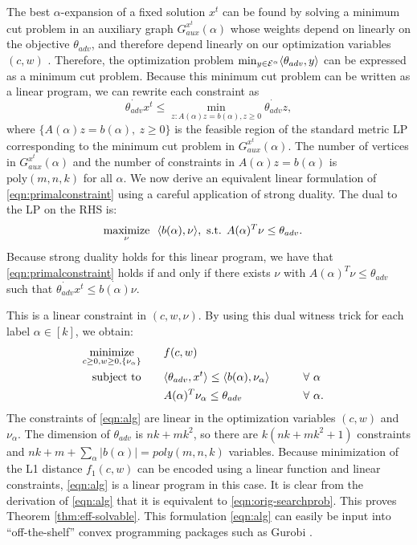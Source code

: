 The best $\alpha$-expansion of a fixed solution $x^t$ can be found by solving a minimum cut problem in an auxiliary graph $G^{x^t}_{aux}(\alpha)$ whose weights depend on linearly on the objective $\theta_{adv}$, and therefore depend linearly on our optimization variables $(c,w)$ \citep[Section 4]{BoyVekZab01}. 
Therefore, the optimization problem $\min_{y\in \mathcal{E}^{\alpha}}\langle \theta_{adv},y\rangle$ can be expressed as a minimum cut problem. 
Because this minimum cut problem can be written as a linear program, we can rewrite each constraint as
\begin{equation}
\label{eqn:primalconstraint}
\dot{\theta_{adv}}{x^t} \le \min_{z: A(\alpha)z=b(\alpha), z\ge 0}\dot{\theta_{adv}}{z},
\end{equation}
where $\{A(\alpha)z = b(\alpha),\ z\ge 0\}$ is the feasible region of the standard metric LP corresponding to the minimum cut problem in $G^{x^t}_{aux}(\alpha)$. The number of vertices in $G^{x^t}_{aux}(\alpha)$ and the number of constraints in $A(\alpha) z = b(\alpha)$ is $\text{poly}(m,n,k)$ for all $\alpha$.
We now derive an equivalent linear formulation of \eqref{eqn:primalconstraint} using a careful application of strong duality. The dual to the LP on the RHS is:
\begin{align*}
\maximize_{\nu}~ &~ \dot{b(\alpha)}{\nu}, 
\text{ s.t. } %
A(\alpha)^T\nu \le \theta_{adv}.
\end{align*}
Because strong duality holds for this linear program, we have that \eqref{eqn:primalconstraint} holds if and only if there exists $\nu$ with $A(\alpha)^T\nu \le \theta_{adv}$ such that
$\dot{\theta_{adv}}{x^t} \le \dot{b(\alpha)}{\nu}$.

This is a linear constraint in $(c,w,\nu)$. By using this dual witness trick for each label $\alpha \in [k]$, we obtain:
\begin{alignat}{2}
\label{eqn:alg}
\mathop{\mathrm{minimize}{}}_{c\ge 0,w\ge 0,\{\nu_{\alpha}\}} \qquad & f(c,w)\\
\text{subject to} \qquad & \langle \theta_{adv},x^t\rangle \le \langle b(\alpha),\nu_{\alpha}\rangle \qquad &&\forall\ \alpha\nonumber\\
\qquad & A(\alpha)^T\nu_{\alpha} \le \theta_{adv} &&\forall\ \alpha\nonumber.
\end{alignat}
The constraints of \eqref{eqn:alg} are linear in the optimization variables $(c,w)$ and $\nu_{\alpha}$.
The dimension of $\theta_{adv}$ is $nk + mk^2$, so there are $k(nk + mk^2 + 1)$ constraints and $nk + m + \sum_{\alpha}|b(\alpha)| = poly(m,n,k)$ variables.
Because minimization of the L1 distance $f_1(c,w)$ can be encoded using a linear function and linear constraints, \eqref{eqn:alg} is a linear program in this case. 
It is clear from the derivation of \eqref{eqn:alg} that it is equivalent to \eqref{eqn:orig-searchprob}. 
This proves Theorem \ref{thm:eff-solvable}.
This formulation \eqref{eqn:alg} can easily be input into ``off-the-shelf'' convex programming packages such as Gurobi \citep{gurobi}.
